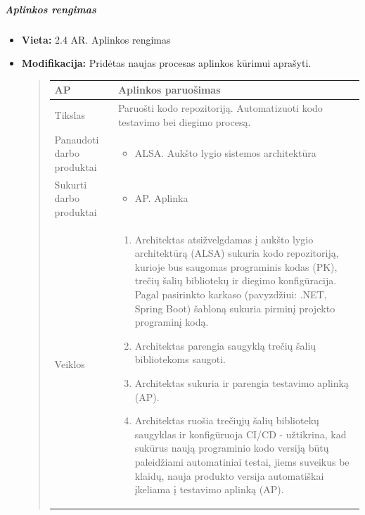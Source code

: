 \documentclass{article}
\begin{document}
\subparagraph{Aplinkos rengimas}
\begin{itemize}
    \item \textbf{Vieta:} 2.4 AR. Aplinkos rengimas 
    \item \textbf{Modifikacija:} Pridėtas naujas procesas aplinkos kūrimui aprašyti. 

    \begin{quote}
    \begin{longtable}{p{}|p{}}
        AP & Aplinkos paruošimas \\ \hline
        Tikslas & Paruošti kodo repozitoriją. Automatizuoti kodo testavimo bei diegimo procesą. \\ \hline
        Panaudoti darbo produktai & \begin{itemize}
            \item ALSA. Aukšto lygio sistemos architektūra
        \end{itemize} \\ \hline
        Sukurti darbo produktai &
        \begin{itemize}
            \item AP. Aplinka
        \end{itemize}
        \\ \hline
        Veiklos & \begin{enumerate}
            \item Architektas atsižvelgdamas į aukšto lygio architektūrą (ALSA) sukuria kodo repozitoriją, kurioje bus saugomas programinis kodas (PK), trečių šalių bibliotekų ir diegimo konfigūracija. Pagal pasirinkto karkaso (pavyzdžiui: .NET, Spring Boot) šabloną  sukuria pirminį projekto programinį kodą.
    
            \item Architektas parengia saugyklą trečių šalių bibliotekoms saugoti.
    
            \item Architektas sukuria ir parengia testavimo aplinką (AP).
    
            \item Architektas ruošia trečiųjų šalių bibliotekų saugyklas ir konfigūruoja CI/CD - užtikrina, kad sukūrus naują programinio kodo versiją būtų paleidžiami automatiniai testai, jiems suveikus be klaidų, nauja produkto versija automatiškai įkeliama į testavimo aplinką (AP).
       \end{enumerate}
    \end{longtable}
    \end{quote}
\end{itemize}
\end{document}
